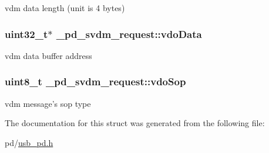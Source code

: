 vdm data length (unit is 4 bytes) \hypertarget{struct__pd__svdm__request_ac674930499f5462b363cb7890746888e}{
\subsubsection[{vdo\-Data}]{\setlength{\rightskip}{0pt plus 5cm}uint32\-\_\-t$\ast$ \-\_\-pd\-\_\-svdm\-\_\-request\-::vdo\-Data}}\label{struct__pd__svdm__request_ac674930499f5462b363cb7890746888e}
vdm data buffer address \hypertarget{struct__pd__svdm__request_a7cc54e0d5070eeec62c3686c716cff28}{
\subsubsection[{vdo\-Sop}]{\setlength{\rightskip}{0pt plus 5cm}uint8\-\_\-t \-\_\-pd\-\_\-svdm\-\_\-request\-::vdo\-Sop}}\label{struct__pd__svdm__request_a7cc54e0d5070eeec62c3686c716cff28}
vdm message's sop type 

The documentation for this struct was generated from the following file\-:\begin{DoxyCompactItemize}
\item 
pd/\hyperlink{usb__pd_8h}{usb\-\_\-pd.\-h}\end{DoxyCompactItemize}
